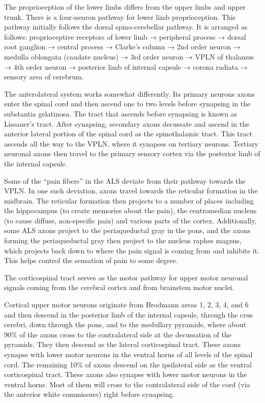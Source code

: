 The proprioception of the lower limbs differs from the upper limbs and upper trunk. There is a four-neuron pathway for lower limb proprioception. This pathway initially follows the dorsal spino-cerebellar pathway. It is arranged as follows: proprioceptive receptors of lower limb → peripheral process → dorsal root ganglion → central process → Clarke's column → 2nd order neuron → medulla oblongata (caudate nucleus) → 3rd order neuron → VPLN of thalamus → 4th order neuron → posterior limb of internal capsule → corona radiata → sensory area of cerebrum.

The anterolateral system works somewhat differently. Its primary neurons axons enter the spinal cord and then ascend one to two levels before synapsing in the substantia gelatinosa. The tract that ascends before synapsing is known as Lissauer's tract. After synapsing, secondary axons decussate and ascend in the anterior lateral portion of the spinal cord as the spinothalamic tract. This tract ascends all the way to the VPLN, where it synapses on tertiary neurons. Tertiary neuronal axons then travel to the primary sensory cortex via the posterior limb of the internal capsule.

Some of the ``pain fibers'' in the ALS deviate from their pathway towards the VPLN. In one such deviation, axons travel towards the reticular formation in the midbrain. The reticular formation then projects to a number of places including the hippocampus (to create memories about the pain), the centromedian nucleus (to cause diffuse, non-specific pain) and various parts of the cortex. Additionally, some ALS axons project to the periaqueductal gray in the pons, and the axons forming the periaqueductal gray then project to the nucleus raphes magnus, which projects back down to where the pain signal is coming from and inhibits it. This helps control the sensation of pain to some degree.

The corticospinal tract serves as the motor pathway for upper motor neuronal signals coming from the cerebral cortex and from brainstem motor nuclei.

Cortical upper motor neurons originate from Brodmann areas 1, 2, 3, 4, and 6 and then descend in the posterior limb of the internal capsule, through the crus cerebri, down through the pons, and to the medullary pyramids, where about 90\% of the axons cross to the contralateral side at the decussation of the pyramids. They then descend as the lateral corticospinal tract. These axons synapse with lower motor neurons in the ventral horns of all levels of the spinal cord. The remaining 10\% of axons descend on the ipsilateral side as the ventral corticospinal tract. These axons also synapse with lower motor neurons in the ventral horns. Most of them will cross to the contralateral side of the cord (via the anterior white commissure) right before synapsing.

